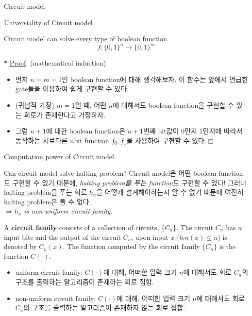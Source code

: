 \documentclass[9pt]{beamer}
\begin{document}
\begin{section}{Circuit model}
        \begin{frame}{Universiality of Circuit model}
            \begin{theorem}
                Circuit model can solve every type of boolean function.
                $$f : \{0, 1\}^n \rightarrow \{0, 1\}^m$$
            \end{theorem}
            \vspace{0.2cm}
            $\ast$ \underline{Proof}: (mathematical induction)
            \begin{itemize}
                \item 먼저 $n=m=1$인 boolean function에 대해 생각해보자. 이 함수는 앞에서 언급한 gate들을 이용하여 쉽게 구현할 수 있다.
                \item (귀납적 가정) $m=1$일 때, 어떤 $n$에 대해서도 boolean function을 구현할 수 있는 회로가 존재한다고 가정하자.
                \item 그럼 $n+1$에 대한 boolean function은 $n+1$번쨰 bit값이 0인지 1인지에 따라서 동작하는 서로다른 $n$bit function $f_0, f_1$을 사용하여 구현할 수 있다.$\Box$
            \end{itemize}
        \end{frame}
    \end{section}

        \begin{frame}{Computation power of Circuit model}
            \begin{alertblock}{Can circuit model solve halting problem?}
                Circuit model은 어떤 boolean function도 구현할 수 있기 때문에, \textit{halting problem을 푸는 function}도 구현할 수 있다! 그러나 halting problem을 푸는 회로 $h_n$을 어떻게 설계해야하는지 알 수 없기 때문에 여전히 halting problem은 풀 수 없다.
                \\ \textit{$\Rightarrow h_n$ is \alert{non-uniform circuit family.}}
            \end{alertblock}
            \begin{definition}
                A \textbf{circuit family} consists of a collection of circuits, $\{C_n\}$. The circuit $C_n$ has $n$ input bits and the output of the circuit $C_n$, upon input $x$ ($len(x) \le n$) is denoted by $C_n(x)$.
                The function computed by the circuit family $\{C_n\}$ is the function $C(·)$.
            \end{definition}
            \begin{itemize}
                \item uniform circuit family: $C(\cdot)$에 대해, 어떠한 입력 크기 $n$에 대해서도 회로 $C_n$의 구조를 출력하는 알고리즘이 존재하는 회로 집합.
                \item non-uniform circuit family: $C(\cdot)$에 대해, 어떠한 입력 크기 $n$에 대해서도 회로 $C_n$의 구조를 출력하는 알고리즘이 존재하지 않는 회로 집합.
            \end{itemize}
        \end{frame}
\end{document}
